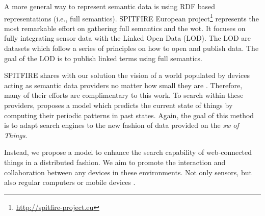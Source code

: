 A more general way to represent semantic data is using RDF based representations (i.e., full semantics).
SPITFIRE European project\footnote{\url{http://spitfire-project.eu}} represents the most remarkable effort on gathering full semantics and the \ac{wot}.
It focuses on fully integrating sensor data with the Linked Open Data (LOD). 
The LOD are datasets which follow a series of principles on how to open and publish data.
The goal of the LOD is to publish linked terms using full semantics.

SPITFIRE shares with our solution the vision of a world populated by devices acting as semantic data providers no matter how small they are \citep{hasemann_rdf_2012}.
Therefore, many of their efforts are complimentary to this work.
To search within these providers, \citet{pfisterer_spitfire:_2011} proposes a model which predicts the current state of things by computing their periodic patterns in past states.
Again, the goal of this method is to adapt search engines to the new fashion of data provided on the \emph{\acl{sw} of Things}.

Instead, we propose a model to enhance the search capability of web-connected things in a distributed fashion.
We aim to promote the interaction and collaboration between any devices in these environments.
Not only sensors, but also regular computers or mobile devices \citep{balandin_access_2011}.